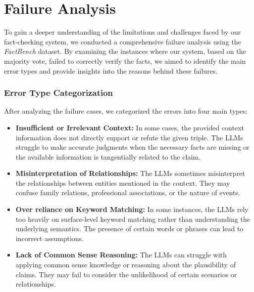 %

\section{Failure Analysis}\label{sec:faiure-analysis}
To gain a deeper understanding of the limitations and challenges faced by our fact-checking system, we conducted a comprehensive failure analysis using the \textit{FactBench} dataset.
By examining the instances where our system, based on the majority vote, failed to correctly verify the facts, we aimed to identify the main error types and provide insights into the reasons behind these failures.
\subsubsection{Error Type Categorization}
After analyzing the failure cases, we categorized the errors into four main types:
\begin{itemize}
    \item \textbf{Insufficient or Irrelevant Context:} In some cases, the provided context information does not directly support or refute the given triple. The LLMs struggle to make accurate judgments when the necessary facts are missing or the available information is tangentially related to the claim.
    \item \textbf{Misinterpretation of Relationships:} The LLMs sometimes misinterpret the relationships between entities mentioned in the context. They may confuse family relations, professional associations, or the nature of events.
    \item \textbf{Over reliance on Keyword Matching:} In some instances, the LLMs rely too heavily on surface-level keyword matching rather than understanding the underlying semantics. The presence of certain words or phrases can lead to incorrect assumptions.
    \item \textbf{Lack of Common Sense Reasoning:} The LLMs can struggle with applying common sense knowledge or reasoning about the plausibility of claims. They may fail to consider the unlikelihood of certain scenarios or relationships.
\end{itemize}


